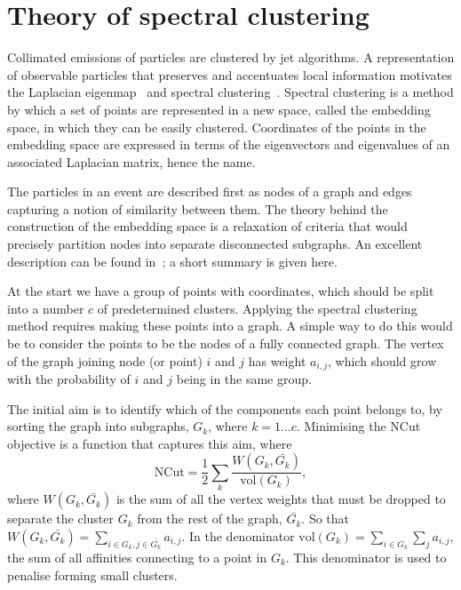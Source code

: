 \section{Theory of spectral clustering}\label{sec:spectral_theory}

Collimated emissions of particles are clustered by jet algorithms.  A
representation of observable particles that preserves and accentuates local information
motivates the Laplacian eigenmap~\cite{Belkin:2003_unfound4} and spectral
clustering~\cite{Ng:2001_unfound543}.
Spectral clustering is a method by which a set of points are represented in a new space,
called the embedding space, in which they can be easily clustered.  Coordinates of the
points in the embedding space are expressed in terms of the eigenvectors and eigenvalues
of an associated Laplacian matrix, hence the name.

The particles in an event are described first as nodes of a graph and
edges capturing a notion of similarity between them.
The theory behind the
construction of the embedding space is a relaxation of criteria that would precisely
partition nodes into separate disconnected subgraphs.
An excellent description can be found in~\cite{UlrikevonLuxburg:2007_unfound52}; a short
summary is given here.

At the start we have a group of points with coordinates, which should be split into a  number \(c\) of predetermined clusters.
Applying the spectral clustering method requires making these points into a graph.
A simple way to do this would be to consider the points to be the nodes of a fully connected graph.
The vertex of the graph joining node (or point) \(i\) and \(j\) has weight \(a_{i, j}\),
which should grow with the probability of \(i\) and \(j\) being in the same group.

The initial aim is to identify which of the components each point belongs to,
by sorting the graph into subgraphs, \(G_k\), where \(k=1 \dots c\).
Minimising the NCut objective is a function that captures this aim, where 
\begin{equation}
    \text{NCut} = \frac{1}{2}\sum_k\frac{W(G_k, \bar{G_k})}{\text{vol}(G_k)},
\end{equation}\label{eqn:cost_function}
where \(W(G_k, \bar{G_k})\) is the sum of all the vertex weights that must be dropped
to separate the cluster \(G_k\) from the rest of the graph, \(\bar{G_k}\).
So that \( W(G_k, \bar{G_k}) = \sum_{i \in G_k, j \in \bar{G_k}} a_{i, j} \).
In the denominator \(\text{vol}(G_k) = \sum_{i \in G_k} \sum_{j} a_{i, j}\),
the sum of all affinities connecting to a point in \(G_k\).
This denominator is used to penalise forming small clusters.

